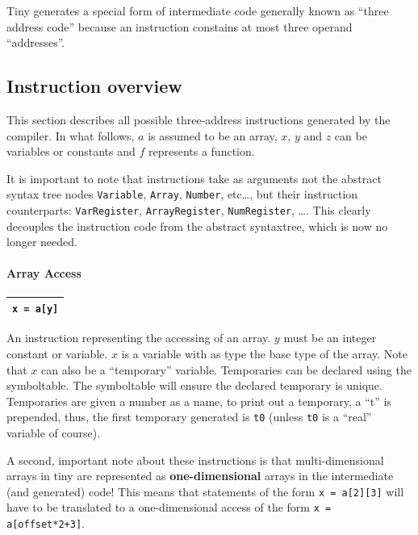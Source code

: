 \documentclass[a4paper]{article}
\begin{document}
Tiny generates a special form of intermediate code generally known as ``three
address code'' because an instruction constains at most three operand
``addresses''.

\subsection{Instruction overview}

This section describes all possible three-address instructions generated
by the compiler. In what follows, $a$ is assumed to be an array, $x$, $y$ and
$z$ can be variables or constants and $f$ represents a function.

It is important to note that instructions take as arguments not the abstract
syntax tree nodes \texttt{Variable}, \texttt{Array}, \texttt{Number},
etc\ldots{}, but their instruction counterparts: \texttt{VarRegister},
\texttt{ArrayRegister}, \texttt{NumRegister}, \ldots{}. This clearly decouples
the instruction code from the abstract syntaxtree, which is now no longer
needed.

\newcommand{\instr}[1]{
  \begin{center}
    \begin{tabular}{|c|}
    \hline
    \textbf{\texttt{#1}}\\
    \hline
  \end{tabular}
\end{center}
}

\paragraph{Array Access\\}
\instr{x = a[y]}

An instruction representing the accessing of an array. $y$ must be an integer
constant or variable. $x$ is a variable with as type the base type of the
array. Note that $x$ can also be a ``temporary'' variable. Temporaries can be
declared using the symboltable. The symboltable will ensure the declared
temporary is unique. Temporaries are given a number as a name, to print out a
temporary, a ``t'' is prepended, thus, the first temporary generated is
\texttt{t0} (unless \texttt{t0} is a ``real'' variable of course).

A second, important note about these instructions is that multi-dimensional
arrays in tiny are represented as \textbf{one-dimensional} arrays in the
intermediate (and generated) code! This means that statements of the form
\texttt{x = a[2][3]} will have to be translated to a one-dimensional access of
the form \texttt{x = a[offset*2+3]}.
\end{document}
